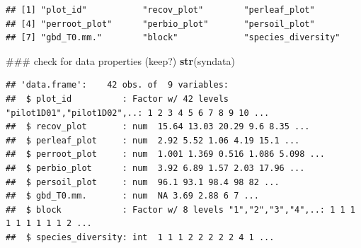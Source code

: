 \documentclass[]{article}
\newenvironment{Shaded}{}{}
\newcommand{\KeywordTok}[1]{\textcolor[rgb]{0.00,0.44,0.13}{\textbf{{#1}}}}
\newcommand{\NormalTok}[1]{{#1}}
\begin{document}
\begin{verbatim}
## [1] "plot_id"           "recov_plot"        "perleaf_plot"     
## [4] "perroot_plot"      "perbio_plot"       "persoil_plot"     
## [7] "gbd_T0.mm."        "block"             "species_diversity"
\end{verbatim}

\begin{Shaded}
\begin{Highlighting}[]

\NormalTok{### check for data properties (keep?)}
\KeywordTok{str}\NormalTok{(syndata)}
\end{Highlighting}
\end{Shaded}

\begin{verbatim}
## 'data.frame':    42 obs. of  9 variables:
##  $ plot_id          : Factor w/ 42 levels "pilot1D01","pilot1D02",..: 1 2 3 4 5 6 7 8 9 10 ...
##  $ recov_plot       : num  15.64 13.03 20.29 9.6 8.35 ...
##  $ perleaf_plot     : num  2.92 5.52 1.06 4.19 15.1 ...
##  $ perroot_plot     : num  1.001 1.369 0.516 1.086 5.098 ...
##  $ perbio_plot      : num  3.92 6.89 1.57 2.03 17.96 ...
##  $ persoil_plot     : num  96.1 93.1 98.4 98 82 ...
##  $ gbd_T0.mm.       : num  NA 3.69 2.88 6 7 ...
##  $ block            : Factor w/ 8 levels "1","2","3","4",..: 1 1 1 1 1 1 1 1 1 2 ...
##  $ species_diversity: int  1 1 1 2 2 2 2 2 4 1 ...
\end{verbatim}
\end{document}
